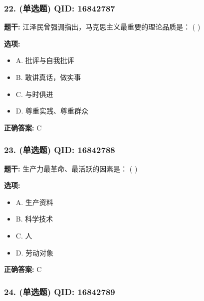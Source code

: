 \documentclass[12pt,UTF8]{ctexart}
\begin{document}
\subsubsection*{22. (单选题) \small QID: 16842787}

\textbf{题干:}
江泽民曾强调指出，马克思主义最重要的理论品质是： ( )

\textbf{选项:}
\begin{itemize}[leftmargin=*]

  \item A. 批评与自我批评

  \item B. 敢讲真话，做实事

  \item C. 与时俱进

  \item D. 尊重实践、尊重群众

\end{itemize}

\textbf{正确答案:}
C

\vspace{0.3em}\hrulefill\vspace{0.7em}

\subsubsection*{23. (单选题) \small QID: 16842788}

\textbf{题干:}
生产力最革命、最活跃的因素是： ( )

\textbf{选项:}
\begin{itemize}[leftmargin=*]

  \item A. 生产资料

  \item B. 科学技术

  \item C. 人

  \item D. 劳动对象

\end{itemize}

\textbf{正确答案:}
C

\vspace{0.3em}\hrulefill\vspace{0.7em}

\subsubsection*{24. (单选题) \small QID: 16842789}
\end{document}
